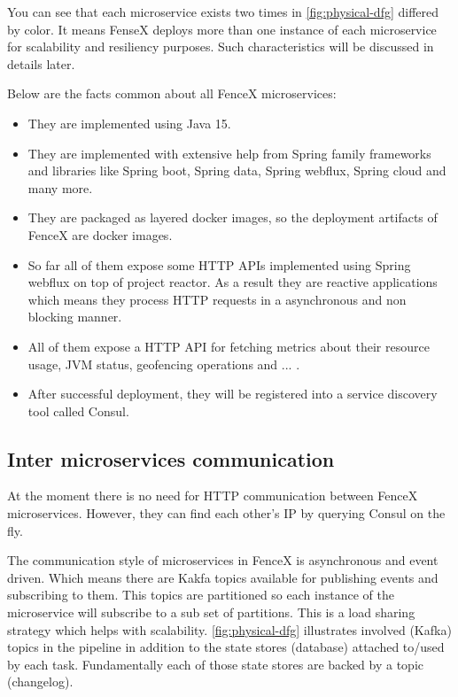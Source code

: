 \documentclass[a4]{report}
\begin{document}
    You can see that each microservice exists two times in \ref{fig:physical-dfg} differed by color.
    It means FenseX deploys more than one instance of each microservice for scalability and resiliency purposes.
    Such characteristics will be discussed in details later.

    Below are the facts common about all FenceX microservices:
    \begin{itemize}
        \item They are implemented using Java 15.
        \item They are implemented with extensive help from Spring family frameworks and libraries like Spring boot, Spring data, Spring webflux, Spring cloud and many more.
        \item They are packaged as layered docker images, so the deployment artifacts of FenceX are docker images.
        \item So far all of them expose some HTTP APIs implemented using Spring webflux on top of project reactor. As a result they are reactive applications which means they process HTTP requests in a asynchronous and non blocking manner.
        \item All of them expose a HTTP API for fetching metrics about their resource usage, JVM status, geofencing operations and ... .
        \item After successful deployment, they will be registered into a service discovery tool called Consul.
    \end{itemize}

    \subsection{Inter microservices communication}
    At the moment there is no need for HTTP communication between FenceX microservices.
    However, they can find each other's IP by querying Consul on the fly.

    The communication style of microservices in FenceX is asynchronous and event driven.
    Which means there are Kakfa topics available for publishing events and subscribing to them.
    This topics are partitioned so each instance of the microservice will subscribe to a sub set of partitions.
    This is a load sharing strategy which helps with scalability.
    \ref{fig:physical-dfg} illustrates involved (Kafka) topics in the pipeline in addition to the state stores (database)
    attached to/used by each task.
    Fundamentally each of those state stores are backed by a topic (changelog).
\end{document}
